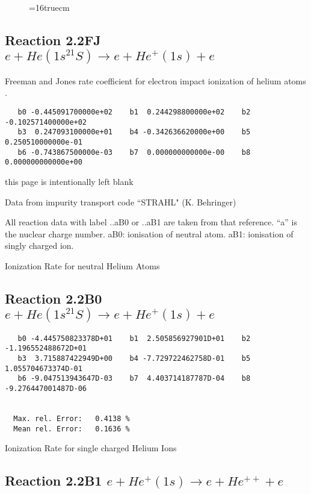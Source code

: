 \documentclass[12pt,dvipdfmx]{article}
\begin{document}
\begin{figure} \label{n2+}
\epsfxsize=16truecm
\end{figure}
\newpage




\subsection{
Reaction 2.2FJ  $e + He(1s^21S) \rightarrow e + He^+(1s) + e$ } Freeman
and Jones rate coefficient for electron impact ionization of helium atoms \cite{kn:Freeman} .

\begin{small}\begin{verbatim}
   b0 -0.445091700000e+02    b1  0.244298800000e+02    b2 -0.102571400000e+02
   b3  0.247093100000e+01    b4 -0.342636620000e+00    b5  0.250510000000e-01
   b6 -0.743867500000e-03    b7  0.000000000000e-00    b8  0.000000000000e+00
\end{verbatim}\end{small}
\newpage
this page is intentionally left blank
\newpage

Data from impurity transport code ``STRAHL" (K. Behringer) \cite{kn:Behringer}

All reaction data with label ..aB0 or ..aB1 are taken from that
reference. ``a'' is the nuclear charge number. aB0: ionisation of neutral atom. aB1: ionisation of singly charged ion.

Ionization Rate for neutral Helium Atoms



\subsection{
Reaction 2.2B0   $e + He(1s^21S) \rightarrow e + He^+(1s) + e $
}
\begin{small}\begin{verbatim}
   b0 -4.445750823378D+01    b1  2.505856927901D+01    b2 -1.196552488672D+01
   b3  3.715887422949D+00    b4 -7.729722462758D-01    b5  1.055704673374D-01
   b6 -9.047513943647D-03    b7  4.403714187787D-04    b8 -9.276447001487D-06


  Max. rel. Error:   0.4138 %
  Mean rel. Error:   0.1636 %
\end{verbatim}\end{small}

  Ionization Rate for single charged Helium Ions

\subsection{
Reaction 2.2B1   $e + He^+(1s) \rightarrow e + He^{++} + e$
}
\end{document}
